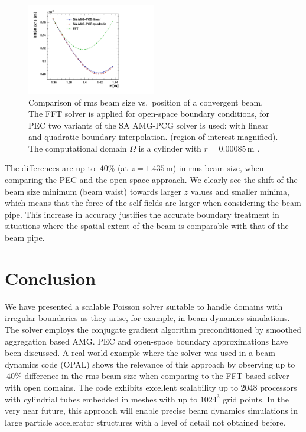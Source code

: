 \documentclass[a4paper,10pt,3p,final,pdftex]{elsarticle}
\begin{document}
\begin{figure}[ht]
  \begin{center}
    \includegraphics[width=0.5\textwidth]{fft-drift-mg-drift-small-RMSX-x-SPOS}
    \caption{Comparison of rms beam size vs.\ position of a convergent
      beam. The FFT solver is applied for open-space boundary
      conditions, for PEC two variants of the SA AMG-PCG solver is used:
      with linear and quadratic boundary interpolation.  (region of
      interest magnified). The computational domain $\Omega$ is a
      cylinder with $r=0.00085$\,m \label{fig:vareps}.}
  \end{center} 
\end{figure}


The differences are up to $~40\%$ (at $z=1.435$\,m) in rms beam size,
when comparing the PEC and the open-space approach. We clearly see the
shift of the beam size minimum (beam waist) towards larger $z$ values
and smaller minima, which means that the force of the self fields are
larger when considering the beam pipe.
This increase in accuracy justifies the 
accurate boundary treatment in situations where the spatial extent of
the beam is comparable with that of the beam pipe.

\section{Conclusion}
\label{sec:concl}

We have presented a scalable Poisson solver suitable to handle domains
with irregular boundaries as they arise, for example, in beam dynamics
simulations.  The solver employs the conjugate gradient algorithm
preconditioned by smoothed aggregation based AMG.  PEC and
open-space boundary approximations have been discussed.  A real world
example where the solver was used in a beam dynamics code (OPAL) shows
the relevance of this approach by observing up to $~40\%$ difference in
the rms beam size when comparing to the FFT-based solver with open
domains.  The code exhibits excellent scalability up to 2048 processors
with cylindrial tubes embedded in meshes with up to $1024^3$ grid
points.  In the very near future, this approach will enable precise beam
dynamics simulations in large particle accelerator structures with a
level of detail not obtained before.
\end{document}
